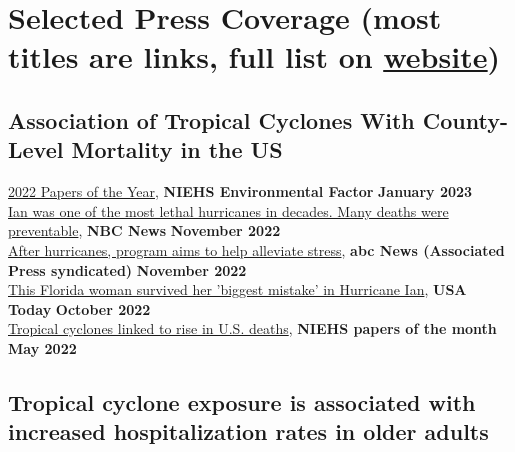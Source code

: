 \section*{Selected Press Coverage (most titles are links, full list on \href{https://sparklabnyc.github.io/site/press_coverage.html}{\underline{website}})}



\subsection*{Association of Tropical Cyclones With County-Level Mortality in the US}

\href{https://factor.niehs.nih.gov/2023/1/science-highlights/papers-of-the-year}{2022 Papers of the Year}, \textbf{NIEHS Environmental Factor} \hfill \textbf{January 2023}\\
\href{https://www.nbcnews.com/news/us-news/hurricane-ian-florida-death-toll-rcna54069}{Ian was one of the most lethal hurricanes in decades. Many deaths were preventable}, \textbf{NBC News} \hfill \textbf{November 2022}\\
\href{https://abcnews.go.com/Health/wireStory/hurricanes-program-aims-alleviate-stress-93206352}{After hurricanes, program aims to help alleviate stress}, \textbf{abc News (Associated Press syndicated)} \hfill \textbf{November 2022}\\
\href{https://www.usatoday.com/story/news/nation/2022/10/04/hurricane-ian-florida-death-toll/8168820001/}{This Florida woman survived her 'biggest mistake' in Hurricane Ian}, \textbf{USA Today} \hfill \textbf{October 2022}\\
\href{https://factor.niehs.nih.gov/2022/5/papers/dert/index.htm}{Tropical cyclones linked to rise in U.S. deaths}, \textbf{NIEHS papers of the month} \hfill \textbf{May 2022}

\subsection*{Tropical cyclone exposure is associated with increased hospitalization rates in older adults}

